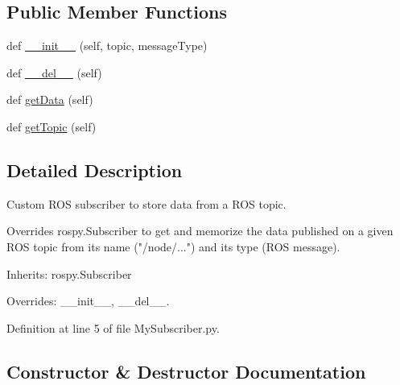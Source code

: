 \subsection*{Public Member Functions}
\begin{DoxyCompactItemize}
\item 
def \mbox{\hyperlink{classwindshape_1_1drone_1_1common_1_1_my_subscriber_1_1_my_subscriber_aab8903d5a44710a25575d8462b195d64}{\+\_\+\+\_\+init\+\_\+\+\_\+}} (self, topic, message\+Type)
\item 
def \mbox{\hyperlink{classwindshape_1_1drone_1_1common_1_1_my_subscriber_1_1_my_subscriber_ad60c57cf3ae7c6eabcfe0d7c6864539e}{\+\_\+\+\_\+del\+\_\+\+\_\+}} (self)
\item 
def \mbox{\hyperlink{classwindshape_1_1drone_1_1common_1_1_my_subscriber_1_1_my_subscriber_ae742a4434dcca3bcc614f4784cc7d8d6}{get\+Data}} (self)
\item 
def \mbox{\hyperlink{classwindshape_1_1drone_1_1common_1_1_my_subscriber_1_1_my_subscriber_a07f832744f619030283a77075635cfd4}{get\+Topic}} (self)
\end{DoxyCompactItemize}


\subsection{Detailed Description}
\begin{DoxyVerb}Custom ROS subscriber to store data from a ROS topic.

Overrides rospy.Subscriber to get and memorize the data published on
a given ROS topic from its name ("/node/...") and its type
(ROS message).

Inherits:
    rospy.Subscriber

Overrides:
    __init__, __del__.
\end{DoxyVerb}
 

Definition at line 5 of file My\+Subscriber.\+py.



\subsection{Constructor \& Destructor Documentation}
\mbox{\label{classwindshape_1_1drone_1_1common_1_1_my_subscriber_1_1_my_subscriber_aab8903d5a44710a25575d8462b195d64}} 
